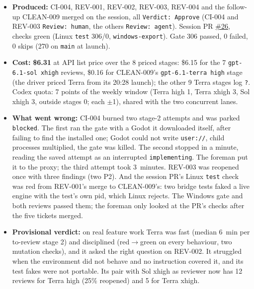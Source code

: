 \documentclass[11pt,a4paper]{article}
\begin{document}
\begin{itemize}
  \item \textbf{Produced:} CI-004, REV-001, REV-002, REV-003, REV-004 and the follow-up CLEAN-009
        merged on the session, all \texttt{Verdict: Approve} (CI-004 and REV-003
        \texttt{Review: human}, the others \texttt{Review: agent}). Session PR
        \href{https://github.com/Laginho/P-Chess/pull/26}{\#26}, checks green (Linux
        \texttt{test} 306/0, \texttt{windows-export}). Gate 306 passed, 0 failed, 0 skips (270 on
        \texttt{main} at launch).
  \item \textbf{Cost:} \textbf{\$6.31} at API list price over the 8 priced stages: \$6.15 for the 7
        \texttt{gpt-6.1-sol xhigh} reviews, \$0.16 for CLEAN-009's \texttt{gpt-6.1-terra high}
        stage (the driver priced Terra from its 20:28 launch); the other 9 Terra stages log
        \texttt{?}. Codex quota: 7 points of the weekly window (Terra high 1, Terra xhigh 3, Sol
        xhigh 3, outside stages 0; each $\pm$1), shared with the two concurrent lanes.
  \item \textbf{What went wrong:} CI-004 burned two stage-2 attempts and was parked
        \texttt{blocked}. The first ran the gate with a Godot it downloaded itself, after failing to
        find the installed one; Godot could not write \texttt{user://}, child processes
        multiplied, the gate was killed. The second stopped in a minute, reading the saved attempt as
        an interrupted \texttt{implementing}. The foreman put it to the proxy; the third attempt took
        3~minutes. REV-003 was reopened once with three findings (two P2). And the session PR's
        Linux \texttt{test} check was red from REV-001's merge to CLEAN-009's: two bridge tests faked
        a live engine with the test's own pid, which Linux rejects. The Windows gate and both reviews
        passed them; the foreman only looked at the PR's checks after the five tickets merged.
  \item \textbf{Provisional verdict:} on real feature work Terra was fast (median 6~min per
        to-review stage 2) and disciplined (red$\to$green on every behaviour, two mutation checks),
        and it asked the right question on REV-002. It struggled when the environment did not
        behave and no instruction covered it, and its test fakes were not portable. Its pair with
        Sol xhigh as reviewer now has 12 reviews for Terra high (25\% reopened) and 5 for Terra
        xhigh.
\end{itemize}
\end{document}
